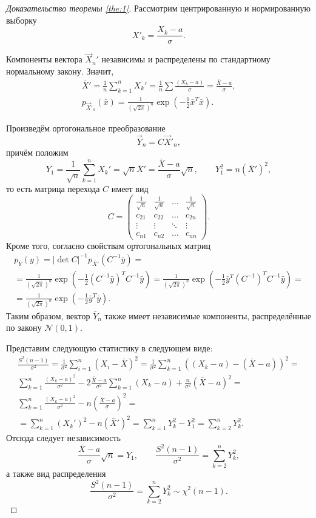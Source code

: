 \begin{proof}[Доказательство теоремы \ref{the:1}]
  Рассмотрим центрированную и нормированную выборку
	\[
		X'_k = \frac{X_k -
		a}{\sigma}.
	\]

	Компоненты вектора $ \vec X_n' $ независимы и распределены по стандартному
	нормальному закону. Значит,  
	\begin{gather*}
		\bar X' = \frac{1}{n} \sum\limits_{k=1}^n X_k' = \frac{1}{n} \sum \frac{(X_k
		- a)}{\sigma} = \frac{\bar X - a}{\sigma}, \\
  p_{\vec X'_n} (\bar x) = \frac{1}{(\sqrt{2\pi})^n} \exp\left(-\frac{1}{2} \bar
		x^T \bar
	x\right).
\end{gather*}

Произведём ортогональное преобразование 
\[
		\vec Y_n = C \vec X'_n,
\]
причём положим 
\[
	Y_1 = \frac{1}{\sqrt{n}} \sum_{k=1}^n X_k' = \sqrt{n} \bar X' = \frac{\bar X -
	a}{\sigma} \sqrt{n}, \qquad Y_1^2 = n (\bar X')^2,
\]
то есть матрица перехода $ C $ имеет вид 
\[
	C = \begin{pmatrix}
		\frac{1}{\sqrt n} & \frac{1}{\sqrt n} &\dots & \frac{1}{\sqrt n}\\
		c_{21} & c_{22} & \dots & c_{2n}\\
		\vdots & \vdots & \ddots & \vdots \\
		c_{n1} & c_{n2} & \dots & c_{nn}
	\end{pmatrix}.
\]
Кроме того, согласно свойствам ортогональных матриц
\begin{multline*}
  p_{\bar Y} (y) = |\det C|^{-1} p_{\bar X'} (C^{-1} \bar y) = \\ =
	\frac{1}{(\sqrt{2\pi})^n} \exp\left(-\frac{1}{2} (C^{-1} \bar y)^T C^{-1} \bar
	y\right) =
	\frac{1}{ \left( \sqrt{2\pi} \right)^n} \exp \left( - \frac{1}{2} \bar y^T
	(C^{-1})^T C^{-1} \bar y \right) = \\ =
	\frac{1}{(\sqrt{2\pi})^n} \exp\left(-\frac{1}{2} \bar y^T \bar y\right).
\end{multline*}
Таким образом, вектор $ \bar Y_n $ также имеет независимые компоненты,
распределённые по закону $ \mathscr N(0,1) $.

Представим следующую статистику в следующем виде:  
\begin{multline*}
	\frac{S^2(n-1)}{\sigma^2} = \frac{1}{\sigma^2} \sum_{i=1}^n \left( X_i - \bar
	X\right)^2 = 
	\frac{1}{\sigma^2} \sum_{k=1}^n ((X_k - a) - (\bar X - a))^2 =\\
		\sum_{k=1}^n \frac{(X_k-a)^2}{\sigma^2}-2 \frac{\bar X - a}{\sigma^2}
		\sum_{k=1}^n (X_k-a) +
		\frac{n}{\sigma^2} (\bar X - a)^2 = \\
		\sum_{k=1}^n \frac{(X_k-a)^2}{\sigma^2} - n \left(\frac{\bar X-a}{\sigma}\right)^2 =
		\\ = 
		\sum_{k=1}^n (X_k')^2 - n (\bar X')^2 = \sum_{k=1}^n Y_k^2 - Y_1^2 = 
		\sum_{k=2}^n Y_k^2.
\end{multline*}
Отсюда следует независимость 
\[
		\frac{\bar X - a}{\sigma}\sqrt n = Y_1, \qquad \frac{S^2(n-1)}{\sigma^2} =
		\sum_{k=2}^n Y^2_k,
\]
а также вид распределения 
\[
	\frac{S^2(n-1)}{\sigma^2} = \sum_{k=2}^n Y^2_k \sim \chi^2(n-1).
\]


\end{proof}
